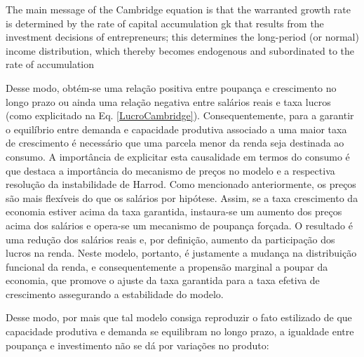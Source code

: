 \begin{citacao}
The main message of the Cambridge
equation is that the warranted growth rate is determined by the rate of capital
accumulation gk that results from the investment decisions of entrepreneurs; this
determines the long-period (or normal) income distribution, which thereby
becomes endogenous and subordinated to the rate of accumulation \cite[p.~158]{cesaratto_neo-kaleckian_2015}
\end{citacao}
Desse modo, obtém-se uma relação positiva entre poupança e crescimento no longo prazo ou ainda uma relação negativa entre salários reais e taxa lucros (como explicitado na Eq. \ref{LucroCambridge}). Consequentemente, para a garantir o equilíbrio entre demanda e capacidade produtiva associado a uma maior taxa de crescimento é necessário que uma parcela menor da renda seja destinada ao consumo. A importância de explicitar esta causalidade em termos do consumo é que destaca a importância do mecanismo de preços no modelo e a respectiva resolução da instabilidade de Harrod. Como mencionado anteriormente, os preços são mais flexíveis do que os salários por hipótese. Assim, se a taxa crescimento da economia estiver acima da taxa garantida, instaura-se um aumento dos preços acima dos salários e opera-se um mecanismo de poupança forçada. O resultado é uma redução dos salários reais e, por definição, aumento da participação dos lucros na renda.  Neste modelo, portanto, é justamente a mudança na distribuição funcional da renda, e consequentemente a propensão marginal a poupar da economia, que promove o ajuste da taxa garantida para a taxa efetiva de crescimento assegurando a estabilidade do modelo.

Desse modo, por mais que tal modelo consiga reproduzir o fato estilizado de que capacidade produtiva e demanda se equilibram no longo prazo, a igualdade entre poupança e investimento não se dá por variações no produto:

